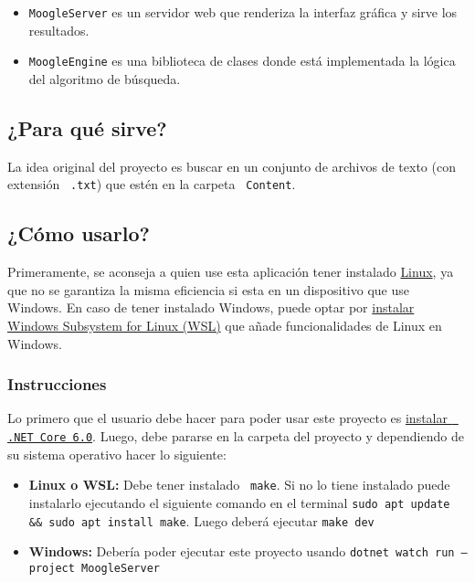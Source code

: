 \documentclass[a4paper, 12pt]{report}
\begin{document}
\begin{itemize}
	\item {\tt MoogleServer} es un servidor web que renderiza la interfaz gráfica y sirve los resultados.
	\item {\tt MoogleEngine} es una biblioteca de clases donde está implementada la lógica del algoritmo de búsqueda.
\end{itemize}

\subsection*{¿Para qué sirve?}

La idea original del proyecto es buscar en un conjunto de archivos de texto
(con extensión {\tt \color{gray45} .txt}) que estén en la carpeta {\tt
		\color{gray45}Content}.

\subsection*{¿Cómo usarlo?}

Primeramente, se aconseja a quien use esta aplicación tener instalado
\href{https://es.wikipedia.org/wiki/Linux}{Linux}, ya que no se garantiza la
misma eficiencia si esta en un dispositivo que use Windows. En caso de tener
instalado Windows, puede optar por
\href{https://learn.microsoft.com/es-es/windows/wsl/install}{instalar Windows
	Subsystem for Linux (WSL)} que a\~nade funcionalidades de Linux en Windows.

\subsubsection*{Instrucciones}

Lo primero que el usuario debe hacer para poder usar este proyecto es
\href{https://learn.microsoft.com/es-es/dotnet/core/install/}{instalar {\tt
			\color{gray45}.NET Core 6.0}}. Luego, debe pararse en la carpeta del proyecto y
dependiendo de su sistema operativo hacer lo siguiente:

\begin{itemize}
	\item {\bf Linux o WSL:} Debe tener instalado {\tt \color{gray45} make}. Si no lo tiene instalado
	      puede instalarlo ejecutando el siguiente comando en el terminal {\tt \color{gray45}sudo apt update \&\& sudo apt install make}. Luego deberá ejecutar {\tt \color{gray45}make dev}

	\item {\bf Windows:} Debería poder ejecutar este proyecto usando {\tt \color{gray45}dotnet watch run --project MoogleServer}
\end{itemize}
\end{document}
